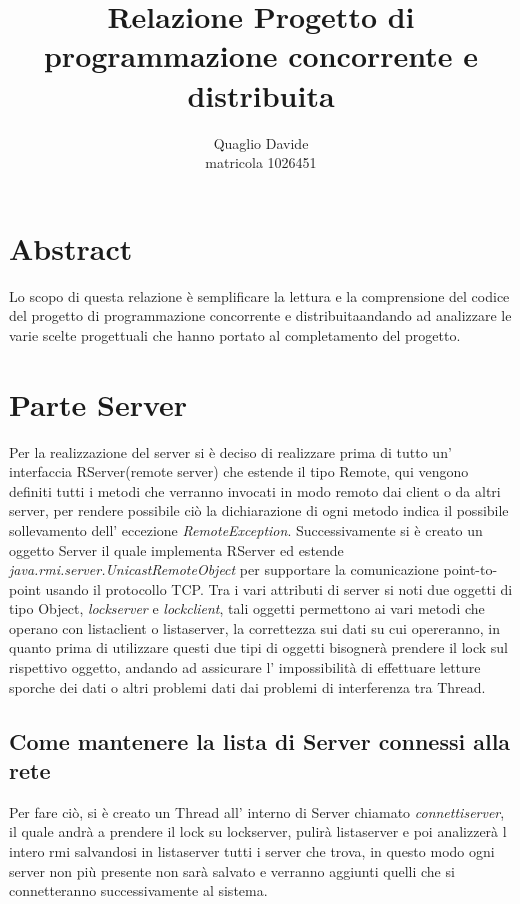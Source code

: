 \documentclass[12pt]{article}
\title{Relazione Progetto di programmazione concorrente e distribuita}
\author{Quaglio Davide \\ matricola 1026451}
\begin{document}
\newcommand{\prog}{programmazione concorrente e distribuita}
\maketitle
\section{Abstract}
Lo scopo di questa relazione è semplificare la lettura e la comprensione del codice del progetto di \prog andando ad analizzare le varie scelte progettuali che hanno portato al completamento del progetto.
\section{Parte Server}
Per la realizzazione del server si è deciso di realizzare prima di tutto un' interfaccia RServer(remote server) che estende il tipo Remote, qui vengono definiti tutti i metodi che verranno invocati in modo remoto dai client o da altri server, per rendere possibile ciò la dichiarazione di ogni metodo indica il possibile sollevamento dell' eccezione \textit{RemoteException}.
Successivamente si è creato un oggetto Server il quale implementa RServer ed estende \textit{java.rmi.server.UnicastRemoteObject} per supportare la comunicazione point-to-point usando il protocollo TCP.
Tra i vari attributi di server si noti due oggetti di tipo Object, \textit{lockserver} e \textit{lockclient}, tali oggetti permettono ai vari metodi che operano con listaclient o listaserver, la correttezza sui dati su cui opereranno, in quanto prima di utilizzare questi due tipi di oggetti bisognerà prendere il lock sul rispettivo oggetto, andando ad assicurare l' impossibilità di effettuare letture sporche dei dati o altri problemi dati dai problemi di interferenza tra Thread.
\subsection{Come mantenere la lista di Server connessi alla rete}
Per fare ciò, si è creato un Thread all' interno di Server chiamato \textit{connettiserver}, il quale andrà a prendere il lock su lockserver, pulirà listaserver e poi analizzerà l intero rmi salvandosi in listaserver tutti i server che trova, in questo modo ogni server non più presente non sarà salvato e verranno aggiunti quelli che si connetteranno successivamente al sistema.
\end{document}
